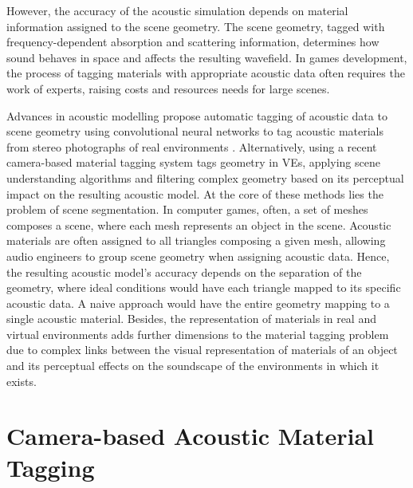 However, the accuracy of the acoustic simulation depends on material information assigned to the scene geometry. The scene geometry, tagged with frequency-dependent absorption and scattering information, determines how sound behaves in space and affects the resulting wavefield. In games development, the process of tagging materials with appropriate acoustic data often requires the work of experts, raising costs and resources needs for large scenes.\par
Advances in acoustic modelling propose automatic tagging of acoustic data to scene geometry using convolutional neural networks to tag acoustic materials from stereo photographs of real environments \cite{li2018scene}. Alternatively, using a recent camera-based material tagging system tags geometry in VEs, applying scene understanding algorithms and filtering complex geometry based on its perceptual impact on the resulting acoustic model. At the core of these methods lies the problem of scene segmentation. In computer games, often, a set of meshes composes a scene, where each mesh represents an object in the scene. Acoustic materials are often assigned to all triangles composing a given mesh, allowing audio engineers to group scene geometry when assigning acoustic data. Hence, the resulting acoustic model's accuracy depends on the separation of the geometry, where ideal conditions would have each triangle mapped to its specific acoustic data. A naive approach would have the entire geometry mapping to a single acoustic material. Besides, the representation of materials in real and virtual environments adds further dimensions to the material tagging problem due to complex links between the visual representation of materials of an object and its perceptual effects on the soundscape of the environments in which it exists.\par

\section{Camera-based Acoustic Material Tagging}\label{sec:camera-tagging}
